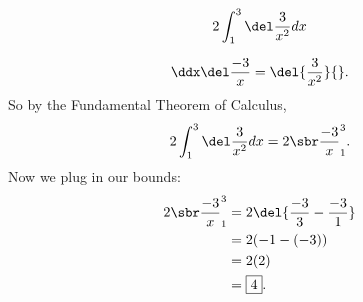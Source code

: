 \renewcommand{\avibounds}{_1^3}
\renewcommand{\avifn}{\del{\frac{3}{x^2}}}
\renewcommand{\avianti}{\frac{-3}{x}}
\renewcommand{\aviconstant}{2}

\begin{probboxed}
    \[
        \aviprob{}
    \]
\end{probboxed}

\aviinversepowerrule
\[
    \ddx\del\avianti{} = \avifn{}.
\]
So by the Fundamental Theorem of Calculus,
\[
    \aviprob{}
    = \avibounded{}.
\]
Now we plug in our bounds:
\begin{align*}
    \avibounded{}
    &= 2\del{\frac{-3}{3} - \frac{-3}{1}} \\
    &= 2(-1 - (-3)) \\
    &= 2(2) \\
    &= \boxed{4}.
\end{align*}
